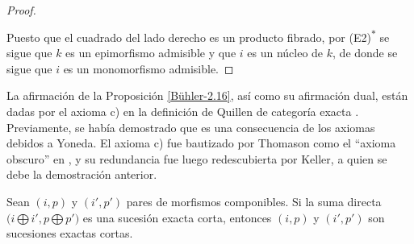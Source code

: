 \documentclass[tesis]{subfiles}
\begin{document}
\begin{proof}
\begin{center}
    \end{center}
    Puesto que el cuadrado del lado derecho es un producto fibrado, por (E2)\textsuperscript{$\ast$} se sigue que $k$ es un epimorfismo admisible y que $i$ es un núcleo de $k$, de donde se sigue que $i$ es un monomorfismo admisible.
\end{proof}

\begin{Obs}
    La afirmación de la Proposición \ref{Bühler-2.16}, así como su afirmación dual, están dadas por el axioma c) en la definición de Quillen de categoría exacta \cite[\S 2]{Quillen}. Previamente, se había demostrado que es una consecuencia de los axiomas debidos a Yoneda\cite{Yoneda}. El axioma c) fue bautizado por Thomason como el ``axioma obscuro'' en \cite{Thomason}, y su redundancia fue luego redescubierta por Keller\cite{Keller}, a quien se debe la demostración anterior.
\end{Obs}

\begin{Coro}\label{Bühler-2.18}
    Sean $(i,p)$ y $(i',p')$ pares de morfismos componibles. Si la suma directa $\big(i\bigoplus i', p\bigoplus p'\big)$ es una sucesión exacta corta, entonces $(i,p)$ y $(i',p')$ son sucesiones exactas cortas.
\end{Coro}
\end{document}
